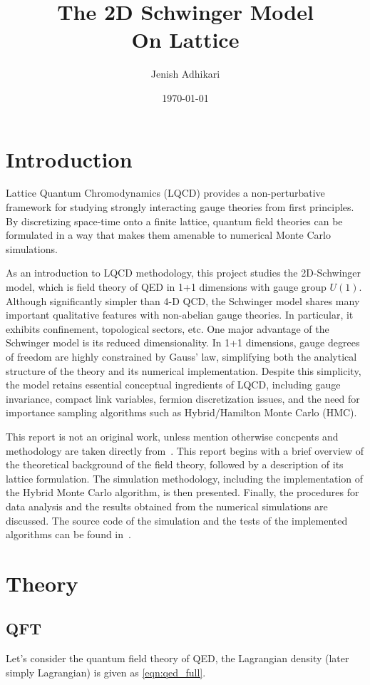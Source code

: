 \documentclass[11pt,titlepage]{article}
\title{The 2D Schwinger Model\\On Lattice}
\author{Jenish Adhikari}
\date{\today}
\begin{document}
\maketitle
\tableofcontents
\newpage
\section{Introduction}
\label{sec:intro}
Lattice Quantum Chromodynamics (LQCD) provides a non-perturbative framework for studying strongly interacting gauge 
theories from first principles. By discretizing space-time onto a finite lattice, quantum field theories can be formulated 
in a way that makes them amenable to numerical Monte Carlo simulations. 

As an introduction to LQCD methodology, this project studies the 2D-Schwinger model, 
which is field theory of QED in 1+1 dimensions with gauge group $U(1)$. Although significantly simpler than
4-D QCD, the Schwinger model shares many important qualitative features with non-abelian gauge theories.
In particular, it exhibits confinement, topological sectors, etc. One major advantage of the Schwinger model is its reduced dimensionality. 
In 1+1 dimensions, gauge degrees of freedom are highly constrained by Gauss’ law, simplifying both the analytical structure of the theory and 
its numerical implementation. Despite this simplicity, the model retains essential conceptual ingredients of LQCD, including gauge invariance, 
compact link variables, fermion discretization issues, and the need for importance sampling algorithms such as Hybrid/Hamilton Monte Carlo (HMC).


This report is not an original work, unless mention otherwise concpents and methodology are taken directly from~\cite{gupta1998introduction}.
This report begins with a brief overview of the theoretical background of the field theory, followed by a description of 
its lattice formulation. The simulation methodology, including the implementation of the Hybrid Monte Carlo algorithm, is then presented. 
Finally, the procedures for data analysis and the results obtained from the numerical simulations are discussed. 
The source code of the simulation and the tests of the implemented algorithms can be found in~\cite{jenish_github}.



\section{Theory}
\subsection{QFT}
Let's consider the quantum field theory of QED, the Lagrangian density (later simply Lagrangian) is given as \cref{eqn:qed_full}.
\end{document}
